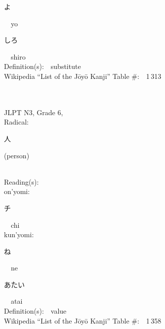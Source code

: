 \begin{multicols}{2}
{\hspace*{2em}}{\begin{CJK}{UTF8}{min} よ \end{CJK}}\ \ yo\ \ \\
{\hspace*{2em}}{\begin{CJK}{UTF8}{min} しろ \end{CJK}}\ \ shiro\ \ \\
Definition(s):\ \ substitute \\
Wikipedia ``List of the J\=oy\=o Kanji'' Table \#:\ \ 1\,313 \\
\ \ \\
{\fontsize{34pt}{40pt}  }\ \ \\  %
{JLPT N3, Grade 6, \\Radical:\ \ {\begin{CJK}{UTF8}{min} 人 \end{CJK}} (person) } \\
Reading(s):\ \ \\
{\hspace*{1em}}on'yomi:\ \ \\
{\hspace*{2em}}{\begin{CJK}{UTF8}{min} チ \end{CJK}}\ \ chi\ \ \\
{\hspace*{1em}}kun'yomi:\ \ \\
{\hspace*{2em}}{\begin{CJK}{UTF8}{min} ね \end{CJK}}\ \ ne\ \ \\
{\hspace*{2em}}{\begin{CJK}{UTF8}{min} あたい \end{CJK}}\ \ atai\ \ \\
Definition(s):\ \ value \\
Wikipedia ``List of the J\=oy\=o Kanji'' Table \#:\ \ 1\,358 \\
\ \ \\
{\fontsize{34pt}{40pt}  }\ \ \\  %

\end{multicols}
